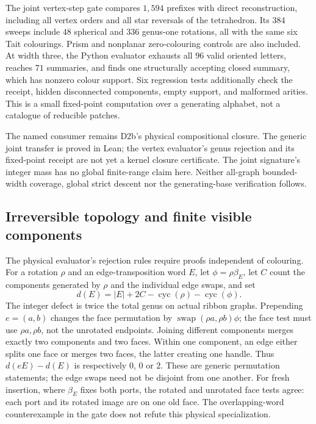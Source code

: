 The joint vertex-step gate compares $1{,}594$ prefixes with direct
reconstruction, including all vertex orders and all star reversals of
the tetrahedron. Its $384$ sweeps include $48$ spherical and $336$
genus-one rotations, all with the same six Tait colourings. Prism and
nonplanar zero-colouring controls are also included. At width three,
the Python evaluator exhausts all $96$ valid oriented letters, reaches
$71$ summaries, and finds one structurally accepting closed summary,
which has nonzero colour support. Six regression tests additionally
check the receipt, hidden disconnected components, empty support, and
malformed arities. This is a small fixed-point computation over a
generating alphabet, not a catalogue of reducible patches.

The named consumer remains D2b's physical compositional closure. The
generic joint transfer is proved in Lean; the vertex evaluator's
genus rejection and its fixed-point receipt are not yet a kernel
closure certificate. The joint signature's integer mass has no global
finite-range claim here. Neither all-graph bounded-width coverage,
global strict descent nor the generating-base verification follows.
\subsection{Irreversible topology and finite visible components}
\label{sec:topology-viability}

The physical evaluator's rejection rules require proofs independent of
colouring. For a rotation $\rho$ and an edge-transposition word $E$, let
$\phi=\rho\beta_E$, let $C$ count the components generated by $\rho$
and the individual edge swaps, and set
\[
 d(E)=|E|+2C-\operatorname{cyc}(\rho)-\operatorname{cyc}(\phi).
\]
The integer defect is twice the total genus on actual ribbon graphs.
Prepending $e=(a,b)$ changes the face permutation by
$\operatorname{swap}(\rho a,\rho b)\phi$; the face test must use
$\rho a,\rho b$, not the unrotated endpoints. Joining different
components merges exactly two components and two faces. Within one
component, an edge either splits one face or merges two faces, the
latter creating one handle. Thus $d(eE)-d(E)$ is respectively $0$, $0$
or $2$. These are generic permutation statements; the edge swaps need
not be disjoint from one another. For fresh insertion, where $\beta_E$
fixes both ports, the rotated and unrotated face tests agree: each port
and its rotated image are on one old face. The overlapping-word
counterexample in the gate does not refute this physical specialization.

